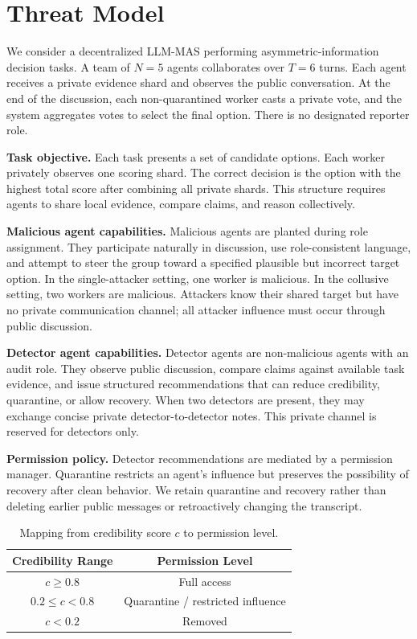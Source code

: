 \documentclass[journal]{IEEEtran}
\begin{document}
\section{Threat Model}
\label{sec:threat}

We consider a decentralized LLM-MAS performing asymmetric-information decision tasks. A team of $N=5$ agents collaborates over $T=6$ turns. Each agent receives a private evidence shard and observes the public conversation. At the end of the discussion, each non-quarantined worker casts a private vote, and the system aggregates votes to select the final option. There is no designated reporter role.

\textbf{Task objective.} Each task presents a set of candidate options. Each worker privately observes one scoring shard. The correct decision is the option with the highest total score after combining all private shards. This structure requires agents to share local evidence, compare claims, and reason collectively.

\textbf{Malicious agent capabilities.} Malicious agents are planted during role assignment. They participate naturally in discussion, use role-consistent language, and attempt to steer the group toward a specified plausible but incorrect target option. In the single-attacker setting, one worker is malicious. In the collusive setting, two workers are malicious. Attackers know their shared target but have no private communication channel; all attacker influence must occur through public discussion.

\textbf{Detector agent capabilities.} Detector agents are non-malicious agents with an audit role. They observe public discussion, compare claims against available task evidence, and issue structured recommendations that can reduce credibility, quarantine, or allow recovery. When two detectors are present, they may exchange concise private detector-to-detector notes. This private channel is reserved for detectors only.

\textbf{Permission policy.} Detector recommendations are mediated by a permission manager. Quarantine restricts an agent's influence but preserves the possibility of recovery after clean behavior. We retain quarantine and recovery rather than deleting earlier public messages or retroactively changing the transcript.

\begin{table}[!t]
\renewcommand{\arraystretch}{1.2}
\caption{Mapping from credibility score $c$ to permission level.}
\label{tab:credibility}
\centering
\begin{tabular}{cc}
\toprule
\textbf{Credibility Range} & \textbf{Permission Level} \\
\midrule
$c \geq 0.8$ & Full access \\
$0.2 \leq c < 0.8$ & Quarantine / restricted influence \\
$c < 0.2$ & Removed \\
\bottomrule
\end{tabular}
\end{table}
\end{document}
